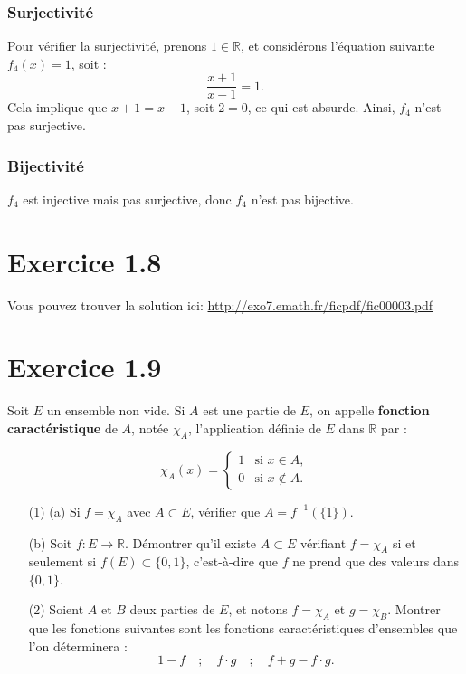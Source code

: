 \documentclass[a4paper,oneside,12pt]{amsbook}
\newcommand{\R}{\mathbb{R}}
\theoremstyle{definition}
\theoremstyle{remark}
\begin{document}
\subsubsection*{Surjectivité}
Pour vérifier la surjectivité, prenons $1\in \R$, et considérons l'équation suivante $f_4(x) = 1$, soit :
\[
\frac{x+1}{x-1} = 1.
\]
Cela implique que $x+1 = x-1$, soit $2=0$, ce qui est absurde. Ainsi, $f_4$ n'est pas surjective.

\subsubsection*{Bijectivité}
$f_4$ est injective mais pas surjective, donc $f_4$ n'est pas bijective.




\section*{Exercice 1.8}
Vous pouvez trouver la solution ici: \url{http://exo7.emath.fr/ficpdf/fic00003.pdf}

\section*{Exercice 1.9}

Soit $E$ un ensemble non vide. Si $A$ est une partie de $E$, on appelle \textbf{fonction caractéristique} de $A$, notée $\chi_A$, l’application définie de $E$ dans $\mathbb{R}$ par :

\[
\chi_A(x) = 
\begin{cases} 
1 & \text{si } x \in A, \\
0 & \text{si } x \notin A.
\end{cases}
\]

\begin{itemize}
    \item[(1)] (a) Si $f = \chi_A$ avec $A \subset E$, vérifier que $A = f^{-1}(\{1\})$.
    
    (b) Soit $f : E \to \mathbb{R}$. Démontrer qu’il existe $A \subset E$ vérifiant $f = \chi_A$ si et seulement si $f(E) \subset \{0,1\}$, c'est-à-dire que $f$ ne prend que des valeurs dans $\{0,1\}$.

    \item[(2)] Soient $A$ et $B$ deux parties de $E$, et notons $f = \chi_A$ et $g = \chi_B$. Montrer que les fonctions suivantes sont les fonctions caractéristiques d’ensembles que l’on déterminera :
    \[
    1 - f \quad ; \quad f \cdot g \quad ; \quad f + g - f \cdot g.
    \]
\end{itemize}
\end{document}
